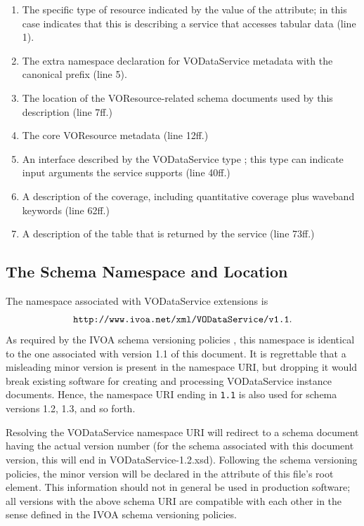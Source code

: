 \documentclass[11pt,a4paper]{ivoa}
\begin{document}
\begin{enumerate}
\item The specific type of resource indicated by
       the value of the  attribute; in this case
        indicates that this is
       describing a service that accesses tabular data (line 1).
\item The extra namespace declaration for 
       VODataService metadata with the canonical prefix (line 5).
\item The location of the VOResource-related schema 
       documents used by this description (line 7ff.)
\item The core VOResource metadata (line 12ff.)
\item An interface described by the
       VODataService type ; this
       type can indicate input arguments the service supports (line
       40ff.)
\item A description of the
       coverage, including quantitative coverage
       plus waveband keywords (line 62ff.)
\item A description of the table that is returned
       by the service (line 73ff.)
\end{enumerate}

\subsection{The Schema Namespace and Location}


The namespace associated with VODataService extensions is
$$\mbox{\texttt{http://www.ivoa.net/xml/VODataService/v1.1}}.$$
As required by the IVOA schema versioning policies
\citep{2018ivoa.spec.0529H}, this namespace is identical to the one
associated with version 1.1 of this document.  It is regrettable that a
misleading minor version is present in the namespace URI, but dropping
it would break existing software for creating and processing
VODataService instance documents.  Hence, the namespace URI ending in
\verb|1.1| is also used for schema versions 1.2, 1.3, and so forth.

Resolving the VODataService namespace URI will redirect to a schema
document having the actual version number (for the schema associated
with this document version, this will end in VODataService-1.2.xsd).
Following the schema versioning policies, the minor version will be
declared in the  attribute of this file's root element.
This information should not in general be used in production software;
all versions with the above schema URI are compatible with each
other in the sense defined in the IVOA schema versioning policies.
\end{document}
